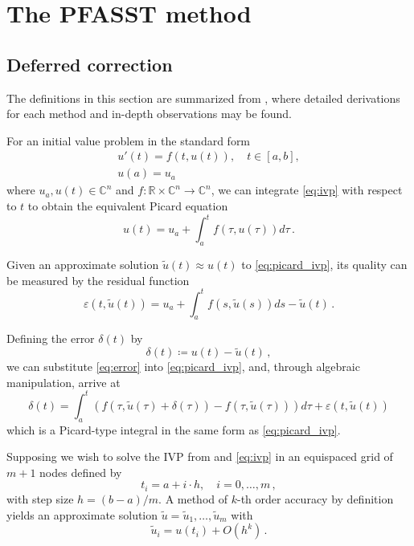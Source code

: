 \chapter{The PFASST method}
\label{chapter:pfasst}

\section{Deferred correction}

The definitions in this section are summarized from \cite{dutt2000spectral}, where detailed derivations for each method and in-depth observations may be found.

For an initial value problem in the standard form
\begin{gather}
    u'(t)=f(t,u(t)),\quad t\in[a,b], \label{eq:ivp} \\
    u(a)=u_a \nonumber
\end{gather}
where \(u_a,u(t)\in\mathbb{C}^n\) and \(f \colon \mathbb{R} \times \mathbb{C}^n \to \mathbb{C}^n \), we can integrate \ref{eq:ivp} with respect to \(t\) to obtain the equivalent Picard equation
\begin{equation}
    u(t)=u_a + \int_a^t f(\tau,u(\tau))d\tau\,.
	\label{eq:picard_ivp}
\end{equation}

Given an approximate solution \(\tilde{u}(t) \approx u(t)\) to \ref{eq:picard_ivp}, its quality can be measured by the residual function
\begin{equation}
    \varepsilon(t,\tilde{u}(t)) = u_a + \int_a^t f(s,\tilde{u}(s))ds - \tilde{u}(t)\,.
	\label{eq:residual}
\end{equation}

Defining the error \(\delta(t)\) by
\begin{equation}
    \delta(t) \coloneqq u(t)-\tilde{u}(t)\,,
	\label{eq:error}
\end{equation}
we can substitute \ref{eq:error} into \ref{eq:picard_ivp}, and, through algebraic manipulation, arrive at
\begin{equation}
    \delta(t) = \int_a^t (
    f(\tau,\tilde{u}(\tau)+\delta(\tau)) 
    - f(\tau,\tilde{u}(\tau))) d\tau
    + \varepsilon(t,\tilde{u}(t))
    \label{eq:dcmethod_ivp}
\end{equation}
which is a Picard-type integral in the same form as \ref{eq:picard_ivp}.

Supposing we wish to solve the IVP from and \ref{eq:ivp} in an equispaced grid of \( m+1 \) nodes defined by
\begin{equation}
    t_i = a + i \cdot h, \quad i = 0,\ldots,m\,,
\end{equation}
with step size \( h=(b-a)/m \). A method of \(k\)-th order accuracy by definition yields an approximate solution \( \tilde{u} = \tilde{u}_1, \ldots, \tilde{u}_m \) with
\begin{equation}
    \tilde{u}_i = u(t_i)+O(h^k)\,.
    \label{eq:approx_sol_accuracy}
\end{equation}

